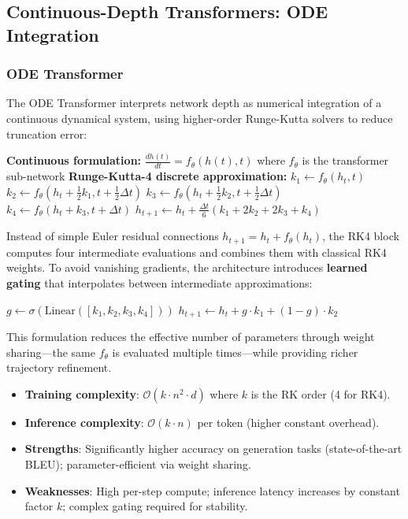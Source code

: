 \documentclass[11pt,a4paper]{article}
\begin{document}
\subsection{Continuous-Depth Transformers: ODE Integration}

\subsubsection{ODE Transformer}
The ODE Transformer \citep{zhang_continuous_2021} interprets network depth as numerical integration of a continuous dynamical system, using higher-order Runge-Kutta solvers to reduce truncation error:

\begin{algorithmic}[1]
\State \textbf{Continuous formulation:} $\frac{dh(t)}{dt} = f_\theta(h(t), t)$ where $f_\theta$ is the transformer sub-network
\State \textbf{Runge-Kutta-4 discrete approximation:}
\State $k_1 \gets f_\theta(h_t, t)$
\State $k_2 \gets f_\theta(h_t + \tfrac{1}{2}k_1, t + \tfrac{1}{2}\Delta t)$
\State $k_3 \gets f_\theta(h_t + \tfrac{1}{2}k_2, t + \tfrac{1}{2}\Delta t)$
\State $k_4 \gets f_\theta(h_t + k_3, t + \Delta t)$
\State $h_{t+1} \gets h_t + \frac{\Delta t}{6}(k_1 + 2k_2 + 2k_3 + k_4)$ 
\end{algorithmic}

Instead of simple Euler residual connections $h_{t+1} = h_t + f_\theta(h_t)$, the RK4 block computes four intermediate evaluations and combines them with classical RK4 weights. To avoid vanishing gradients, the architecture introduces \textbf{learned gating} that interpolates between intermediate approximations:

\begin{algorithmic}[1]
\State $g \gets \sigma(\text{Linear}([k_1, k_2, k_3, k_4]))$ 
\State $h_{t+1} \gets h_t + g \cdot k_1 + (1-g) \cdot k_2$ 
\end{algorithmic}

This formulation reduces the effective number of parameters through weight sharing---the same $f_\theta$ is evaluated multiple times---while providing richer trajectory refinement.

\begin{itemize}[leftmargin=*]
    \item \textbf{Training complexity}: $\mathcal{O}(k \cdot n^2 \cdot d)$ where $k$ is the RK order (4 for RK4).
    \item \textbf{Inference complexity}: $\mathcal{O}(k \cdot n)$ per token (higher constant overhead).
    \item \textbf{Strengths}: Significantly higher accuracy on generation tasks (state-of-the-art BLEU); parameter-efficient via weight sharing.
    \item \textbf{Weaknesses}: High per-step compute; inference latency increases by constant factor $k$; complex gating required for stability.
\end{itemize}
\end{document}
